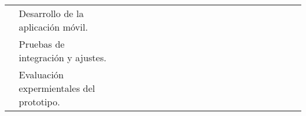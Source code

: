 \begin{landscape}
\begin{ThreePartTable}
\begin{longtable}{|p{}|p{5.5cm}|p{5.5cm}|l|l|l|l|l|l|l|l|l|l|l|l|l|l|l|l|l|l|l|}
      \cline{2-2}\cline{4-21}
                                                                                                                                                                                               & Desarrollo de la aplicación móvil.                                                         &                                                                                                                  &                                       &                                       &                                      &                                       &                        &                        &                        &                        &                        &                        &                        & \cellcolor{magenta!70} & \cellcolor{magenta!70} &                        &                        \\
      \cline{2-2}\cline{4-21}
                                                                                                                                                                                               & Pruebas de integración y ajustes.                                                          &                                                                                                                  &                                       &                                       &                                      &                                       &                        &                        &                        &                        &                        &                        &                        &                        &                        & \cellcolor{magenta!70} &                        \\
      \cline{2-2}\cline{4-21}
                                                                                                                                                                                               & Evaluación expermientales del prototipo.                                                   &                                                                                                                  &                                       &                                       &                                      &                                       &                        &                        &                        &                        &                        &                        &                        &                        &                        & \cellcolor{magenta!70} &                        \\

\end{longtable}
\end{ThreePartTable}
\end{landscape}
